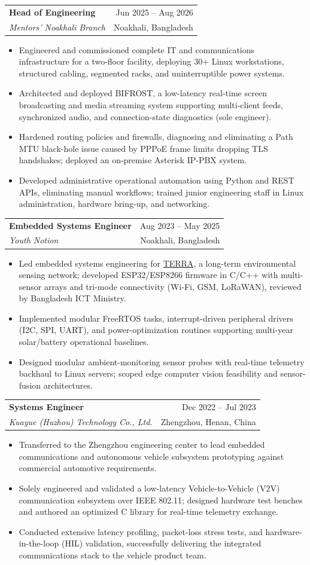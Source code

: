 \documentclass[a4paper,11pt]{article}
\makeatletter
\newcommand{\resumeItem}[1]{
\item\small{#1}
}
\newcommand{\resumeSubheading}[4]{
  \vspace{-1pt}
\item
  \begin{tabular*}{\linewidth}{@{}l@{\extracolsep{\fill}}r@{}}
    \textbf{\color{textcolor}#1} & {\small #4} \\
    {\small\color{accentcolor}\textit{#3}} & {\small #2}
  \end{tabular*}\vspace{-3pt}
}
\newcommand{\resumeItemListStart}{
\begin{itemize}[itemsep=2pt,topsep=2pt,parsep=0pt]}
\newcommand{\resumeItemListEnd}{
\end{itemize}\vspace{-2pt}}
\makeatother
\begin{document}
\resumeSubheading
{Head of Engineering}{Noakhali, Bangladesh}
{Mentors' Noakhali Branch}{Jun 2025 -- Aug 2026}
\resumeItemListStart
\resumeItem{Engineered and commissioned complete IT and communications infrastructure for a two-floor facility, deploying 30+ Linux workstations, structured cabling, segmented racks, and uninterruptible power systems.}
\resumeItem{Architected and deployed BIFROST, a low-latency real-time screen broadcasting and media streaming system supporting multi-client feeds, synchronized audio, and connection-state diagnostics (sole engineer).}
\resumeItem{Hardened routing policies and firewalls, diagnosing and eliminating a Path MTU black-hole issue caused by PPPoE frame limits dropping TLS handshakes; deployed an on-premise Asterisk IP-PBX system.}
\resumeItem{Developed administrative operational automation using Python and REST APIs, eliminating manual workflows; trained junior engineering staff in Linux administration, hardware bring-up, and networking.}
\resumeItemListEnd

\resumeSubheading
{Embedded Systems Engineer}{Noakhali, Bangladesh}
{Youth Notion}{Aug 2023 -- May 2025}
\resumeItemListStart
\resumeItem{Led embedded systems engineering for \href{https://youthnotion.github.io/TERRA/}{TERRA}, a long-term environmental sensing network; developed ESP32/ESP8266 firmware in C/C++ with multi-sensor arrays and tri-mode connectivity (Wi-Fi, GSM, LoRaWAN), reviewed by Bangladesh ICT Ministry.}
\resumeItem{Implemented modular FreeRTOS tasks, interrupt-driven peripheral drivers (I2C, SPI, UART), and power-optimization routines supporting multi-year solar/battery operational baselines.}
\resumeItem{Designed modular ambient-monitoring sensor probes with real-time telemetry backhaul to Linux servers; scoped edge computer vision feasibility and sensor-fusion architectures.}
\resumeItemListEnd

\resumeSubheading
{Systems Engineer}{Zhengzhou, Henan, China}
{Kuayue (Huzhou) Technology Co., Ltd.}{Dec 2022 -- Jul 2023}
\resumeItemListStart
\resumeItem{Transferred to the Zhengzhou engineering center to lead embedded communications and autonomous vehicle subsystem prototyping against commercial automotive requirements.}
\resumeItem{Solely engineered and validated a low-latency Vehicle-to-Vehicle (V2V) communication subsystem over IEEE 802.11; designed hardware test benches and authored an optimized C library for real-time telemetry exchange.}
\resumeItem{Conducted extensive latency profiling, packet-loss stress tests, and hardware-in-the-loop (HIL) validation, successfully delivering the integrated communications stack to the vehicle product team.}
\resumeItemListEnd
\end{document}
